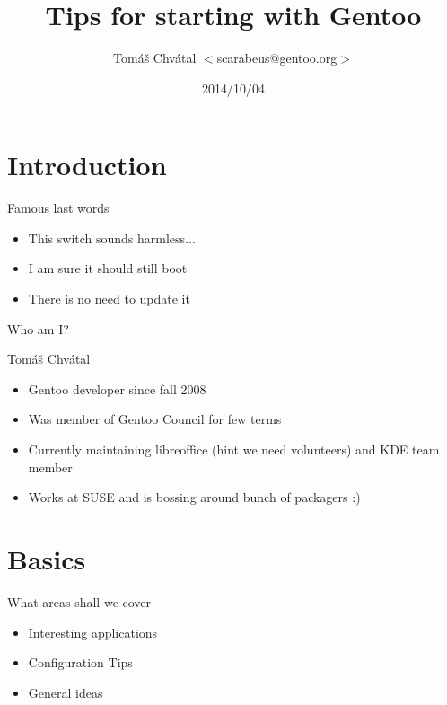 \documentclass{beamer}
\title{Tips for starting with Gentoo}
\author[Tomáš Chvátal]{Tomáš Chvátal $<$scarabeus@gentoo.org$>$}
\date{2014/10/04}
\begin{document}
\frame{\titlepage}
\section{Introduction}
\begin{frame}{Famous last words}
\begin{itemize}
	\item This switch sounds harmless...
	\item I am sure it should still boot
	\item There is no need to update it
\end{itemize}
\end{frame}

\begin{frame}{Who am I?}
	\begin{center}Tomáš Chvátal\end{center}
	\begin{itemize}
		\item Gentoo developer since fall 2008
		\item Was member of Gentoo Council for few terms
		\item Currently maintaining libreoffice (hint we need volunteers) and KDE team member
		\item Works at SUSE and is bossing around bunch of packagers :)
	\end{itemize}
\end{frame}
\section{Basics}
\begin{frame}{What areas shall we cover}
	\begin{itemize}
		\item Interesting applications
		\item Configuration Tips
		\item General ideas
	\end{itemize}
\end{frame}
\end{document}
